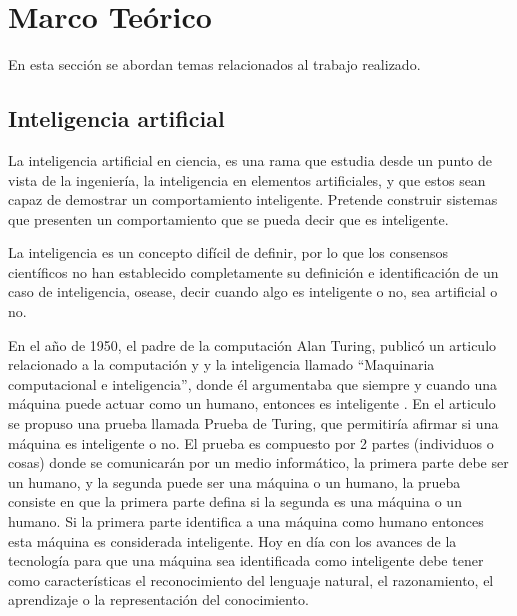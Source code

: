 \documentclass[twoside,spanish,ESP,MSc]{plantillaLabUPV}
\theoremstyle{definition}
\begin{document}


\chapter{Marco Teórico} \label{chap:marcoteori} 

En esta sección se abordan temas relacionados al trabajo realizado.




\section{Inteligencia artificial}

La inteligencia artificial en ciencia, es una rama que estudia desde un punto de vista de la ingeniería, la inteligencia en elementos artificiales, y que estos sean capaz de demostrar un comportamiento inteligente. Pretende construir sistemas que presenten un comportamiento que se pueda decir que es inteligente.


La inteligencia es un concepto difícil de definir, por lo que los consensos científicos no han establecido completamente su definición e identificación de un caso de inteligencia, osease, decir cuando algo es inteligente o no, sea artificial o no.

En el año de 1950, el padre de la computación Alan Turing, publicó un articulo relacionado a la computación y y la inteligencia llamado ``Maquinaria computacional e inteligencia'', donde él argumentaba que siempre y cuando una máquina puede actuar como un humano, entonces es inteligente \cite{iabook}. En el articulo se propuso una prueba llamada Prueba de Turing, que permitiría afirmar si una máquina es inteligente o no. El prueba es compuesto por 2 partes (individuos o cosas) donde se comunicarán por un medio informático, la primera parte debe ser un humano, y la segunda puede ser una máquina o un humano, la prueba consiste en que la primera parte defina si la segunda es una máquina o un humano. Si la primera parte identifica a una máquina como humano entonces esta máquina es considerada inteligente. Hoy en día con los avances de la tecnología para que una máquina sea identificada como inteligente debe tener como características el reconocimiento del lenguaje natural, el razonamiento, el aprendizaje o la representación del conocimiento.
\end{document}
